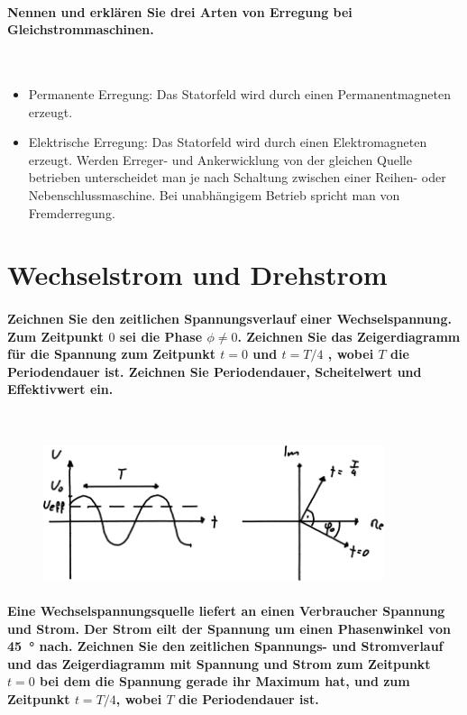 \documentclass[a4paper, 11pt, ngerman, parskip=half-]{scrartcl}
\begin{document}
\paragraph{Nennen und erklären Sie drei Arten von Erregung bei Gleichstrommaschinen.} ~

\begin{itemize}
    \item Permanente Erregung: Das Statorfeld wird durch einen Permanentmagneten erzeugt.

    \item Elektrische Erregung: Das Statorfeld wird durch einen Elektromagneten erzeugt. Werden
          Erreger- und Ankerwicklung von der gleichen Quelle betrieben unterscheidet man je nach
          Schaltung zwischen einer Reihen- oder Nebenschlussmaschine. Bei unabhängigem Betrieb spricht
          man von Fremderregung.
\end{itemize}

\newpage

\section{Wechselstrom und Drehstrom}

\paragraph{Zeichnen Sie den zeitlichen Spannungsverlauf einer Wechselspannung. Zum Zeitpunkt $0$ sei
    die Phase $\phi \neq 0$. Zeichnen Sie das Zeigerdiagramm für die Spannung zum Zeitpunkt $t=0$ und
    $t=T/4$ , wobei $T$ die Periodendauer ist. Zeichnen Sie Periodendauer, Scheitelwert und Effektivwert
    ein.} ~

\begin{figure}[H]
    \centering
    \includegraphics[width=10cm]{image/09/1}
\end{figure}

\paragraph{Eine Wechselspannungsquelle liefert an einen Verbraucher Spannung und Strom. Der Strom
    eilt der Spannung um einen Phasenwinkel von \SI{45}{\degree} nach. Zeichnen Sie den zeitlichen
    Spannungs- und Stromverlauf und das Zeigerdiagramm mit Spannung und Strom zum Zeitpunkt $t=0$ bei
    dem die Spannung gerade ihr Maximum hat, und zum Zeitpunkt $t=T/4$, wobei $T$ die Periodendauer
    ist.} ~
\end{document}
